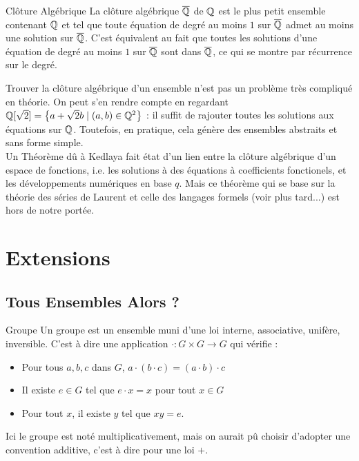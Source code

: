 \documentclass{cours}
\begin{document}
    \begin{définition}{Clôture Algébrique}{}
        La clôture algébrique $\overline{\mathbb{Q}}$ de $\mathbb{Q}$ est le plus petit ensemble contenant $\mathbb{Q}$ et tel que toute équation de degré au moins $1$ sur $\overline{\mathbb{Q}}$ admet au moins une solution sur $\overline{\mathbb{Q}}$. C'est équivalent au fait que toutes les solutions d'une équation de degré au moins $1$ sur $\overline{\mathbb{Q}}$ sont dans $\overline{\mathbb{Q}}$, ce qui se montre par récurrence sur le degré.
    \end{définition}

    Trouver la clôture algébrique d'un ensemble n'est pas un problème très compliqué en théorie.  On peut s'en rendre compte en regardant $\mathbb{Q}[\sqrt{2}] = \left\{a + \sqrt{2}b \mid (a, b) \in \mathbb{Q}^{2}\right\}$ : il suffit de rajouter toutes les solutions aux équations sur $\mathbb{Q}$. Toutefois, en pratique, cela génère des ensembles abstraits et sans forme simple.\\

    Un Théorème dû à Kedlaya fait état d'un lien entre la clôture algébrique d'un espace de fonctions, i.e. les solutions à des équations à coefficients fonctionels, et les développements numériques en base $q$. Mais ce théorème qui se base sur la théorie des séries de Laurent et celle des langages formels (voir plus tard...) est hors de notre portée.

    \section{Extensions}
    \subsection{Tous Ensembles Alors ?}
    \begin{définition}{Groupe}{}
        Un groupe est un ensemble muni d'une loi interne, associative, unifère, inversible. C'est à dire une application $\cdot : G \times G \rightarrow G$ qui vérifie : 
    \begin{itemize}
        \item Pour tous $a, b, c$ dans $G$, $a \cdot (b \cdot c) = (a\cdot b) \cdot c$
        \item Il existe $e \in G$ tel que $e \cdot x = x$ pour tout $x \in G$
        \item Pour tout $x$, il existe $y$ tel que $xy = e$.
    \end{itemize}
    Ici le groupe est noté multiplicativement, mais on aurait pû choisir d'adopter une convention additive, c'est à dire pour une loi $+$.
    \end{définition}
\end{document}
